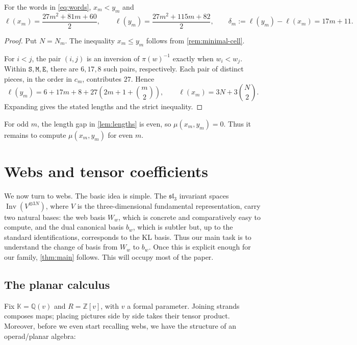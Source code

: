 \documentclass[a4paper,11pt]{amsart}
\newcommand{\F}{\mathbb K}
\newcommand{\Inv}{\operatorname{Inv}}
\newcommand{\wordstart}{\mathtt{S}}
\newcommand{\wordmiddle}{\mathtt{M}}
\newcommand{\wordend}{\mathtt{E}}
\newcommand{\tpar}{v}
\numberwithin{equation}{subsection}
\theoremstyle{plain}
\theoremstyle{definition}
\theoremstyle{remark}
\begin{document}
\begin{lemma}\label{lem:lengths}
For the words in \autoref{eq:words}, $x_m<y_m$ and
\[
\ell(x_m)=\frac{27m^2+81m+60}{2},\qquad
\ell(y_m)=\frac{27m^2+115m+82}{2},\qquad
\delta_m:=\ell(y_m)-\ell(x_m)=17m+11.
\]
\end{lemma}

\begin{proof}
Put $N=N_m$. The inequality $x_m\le y_m$ follows from
\autoref{rem:minimal-cell}.

For $i<j$, the pair $(i,j)$ is an inversion of $\pi(w)^{-1}$
exactly when $w_i<w_j$.
Within $\wordstart,\wordmiddle,\wordend$, there are $6,17,8$ such pairs,
respectively. Each pair of distinct pieces, in the order in $c_m$,
contributes $27$. Hence
\[
\ell(y_m)=6+17m+8+27\left(2m+1+\binom m2\right),\qquad
\ell(x_m)=3N+3\binom N2.
\]
Expanding gives the stated lengths and the strict inequality.
\end{proof}

For odd $m$, the length gap in
\autoref{lem:lengths} is even, so $\mu(x_m,y_m)=0$.
Thus it remains to compute $\mu(x_m,y_m)$ for even $m$.

\section{Webs and tensor coefficients}\label{sec:webs}

We now turn to webs. The basic idea is simple. The $\mathfrak{sl}_3$ invariant spaces $\Inv(V^{\otimes3N})$,
where $V$ is the three-dimensional fundamental representation, carry two natural bases: the web basis $W_w$, which is concrete and comparatively easy to compute, and the dual canonical basis $b_w$, which is subtler but, up to the standard identifications, corresponds to the KL basis. Thus our main task is to understand the change of basis from $W_w$ to $b_w$. Once this is explicit enough for our family, \autoref{thm:main} follows. This will occupy most of the paper.

\subsection{The planar calculus}

Fix $\F=\mathbb Q(\tpar)$ and $R=\mathbb Z[\tpar]$, with $\tpar$ a formal
parameter. Joining strands composes maps; placing
pictures side by side takes their tensor product. 
Moreover, before we even start recalling webs, we have the structure
of an operad/planar algebra:
\end{document}
